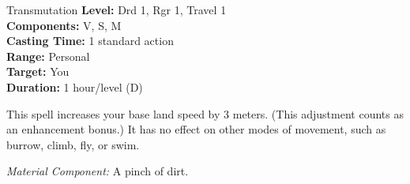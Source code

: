 {Transmutation}
{
	\textbf{Level:}
	Drd 1, Rgr 1, Travel 1\\
	\textbf{Components:}
	V, S, M\\
	\textbf{Casting Time:}
	1 standard action\\
	\textbf{Range:}
	Personal\\
	\textbf{Target:}
	You\\
	\textbf{Duration:}
	1 hour/level (D)\\
}
{
	This spell increases your base land speed by 3 meters. (This adjustment counts as an enhancement bonus.) It has no effect on other modes of movement, such as burrow, climb, fly, or swim.

	\textit{Material Component:}
	A pinch of dirt.

}
